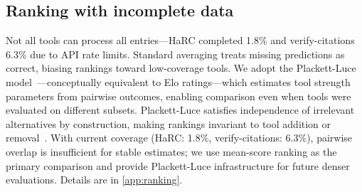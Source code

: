 \subsection{Ranking with incomplete data}
\label{sec:ranking}

Not all tools can process all entries---HaRC completed 1.8\% and verify-citations 6.3\% due to API rate limits.
Standard averaging treats missing predictions as correct, biasing rankings toward low-coverage tools.
We adopt the Plackett-Luce model~\citep{luce1959,plackett1975}---conceptually equivalent to Elo ratings---which estimates tool strength parameters from pairwise outcomes, enabling comparison even when tools were evaluated on different subsets.
Plackett-Luce satisfies independence of irrelevant alternatives by construction, making rankings invariant to tool addition or removal~\citep{hardt2025benchmarks}.
With current coverage (HaRC: 1.8\%, verify-citations: 6.3\%), pairwise overlap is insufficient for stable estimates; we use mean-score ranking as the primary comparison and provide Plackett-Luce infrastructure for future denser evaluations.
Details are in \cref{app:ranking}.
